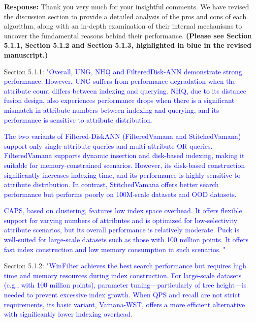 \documentclass[sigconf, nonacm]{acmart}
\newcounter{weakness}[section]
\newcounter{detailed}[section]
\begin{document}
\noindent
\textbf{Response:} 
%
Thank you very much for your insightful comments.  We have revised the discussion section to provide a detailed analysis of the pros and cons of each algorithm, along with an in-depth examination of their internal mechanisms to uncover the fundamental reasons behind their performance.
\textbf{(Please see Section 5.1.1, Section 5.1.2 and Section 5.1.3, highlighted in blue in the revised manuscript.)}

Section 5.1.1:\textcolor{blue}{
	"Overall, UNG, NHQ and FilteredDisk-ANN demonstrate strong performance. However, UNG suffers from performance degradation when the attribute count differs between indexing and querying. NHQ, due to its distance fusion design, also experiences performance drops when there is a significant mismatch in attribute numbers between indexing and querying, and its performance is sensitive to attribute distribution. }

\textcolor{blue}{The two variants of Filtered-DiskANN (FilteredVamana and StitchedVamana) support only single-attribute queries and multi-attribute OR queries. FilteredVamana supports dynamic insertion and disk-based indexing, making it suitable for memory-constrained scenarios. However, its disk-based construction significantly increases indexing time, and its performance is highly sensitive to attribute distribution. In contrast, StitchedVamana offers better search performance but performs poorly on 100M-scale datasets and OOD datasets.}

\textcolor{blue}{
	CAPS, based on clustering, features low index space overhead. It offers flexible support for varying numbers of attributes and is optimized for low-selectivity attribute scenarios, but its overall performance is relatively moderate.
	Puck is well-suited for large-scale datasets such as those with 100 million points. It offers fast index construction and low memory consumption in such scenarios. "}


Section 5.1.2: \textcolor{blue}{
	"WinFilter achieves the best search performance but requires high time and memory resources during index construction. For large-scale datasets (e.g., with 100 million points), parameter tuning—particularly of tree height—is needed to prevent excessive index growth. When QPS and recall are not strict requirements, its basic variant, Vamana-WST, offers a more efficient alternative with significantly lower indexing overhead.
}
\end{document}
